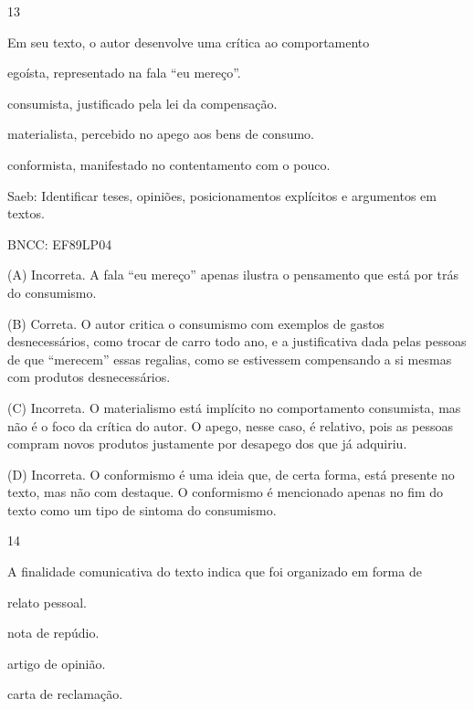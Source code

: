 
\num{13}

Em seu texto, o autor desenvolve uma crítica ao comportamento

\begin{escolha}
\item egoísta, representado na fala ``eu mereço''.

\item consumista, justificado pela lei da compensação.

\item materialista, percebido no apego aos bens de consumo.

\item conformista, manifestado no contentamento com o pouco.
\end{escolha}

Saeb: Identificar teses, opiniões, posicionamentos explícitos e
argumentos em textos.

BNCC: EF89LP04

(A) Incorreta. A fala ``eu mereço'' apenas ilustra o pensamento que está
por trás do consumismo.

(B) Correta. O autor critica o consumismo com exemplos de gastos
desnecessários, como trocar de carro todo ano, e a justificativa dada
pelas pessoas de que ``merecem'' essas regalias, como se estivessem
compensando a si mesmas com produtos desnecessários.

(C) Incorreta. O materialismo está implícito no comportamento
consumista, mas não é o foco da crítica do autor. O apego, nesse caso, é
relativo, pois as pessoas compram novos produtos justamente por desapego
dos que já adquiriu.

(D) Incorreta. O conformismo é uma ideia que, de certa forma, está
presente no texto, mas não com destaque. O conformismo é mencionado
apenas no fim do texto como um tipo de sintoma do consumismo.

\num{14}

A finalidade comunicativa do texto indica que foi organizado em forma de

\begin{escolha}
\item relato pessoal.

\item nota de repúdio.

\item artigo de opinião.

\item carta de reclamação.
\end{escolha}

